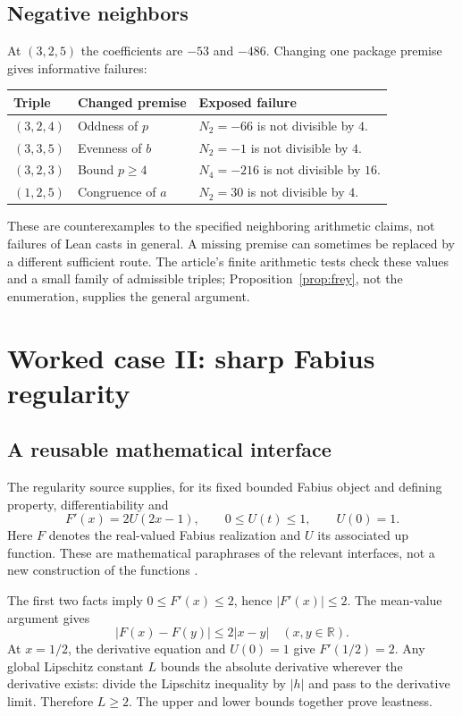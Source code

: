 \documentclass[11pt,a4paper]{article}
\newcommand{\R}{\mathbb R}
\theoremstyle{definition}
\theoremstyle{remark}
\begin{document}
\subsection{Negative neighbors}
At $(3,2,5)$ the coefficients are $-53$ and $-486$. Changing one package premise gives informative failures:
\begin{center}\small
\begin{tabularx}{\textwidth}{@{}l Y Y@{}}
\toprule Triple & Changed premise & Exposed failure\\\midrule
$(3,2,4)$ & Oddness of $p$ & $N_2=-66$ is not divisible by $4$.\\
$(3,3,5)$ & Evenness of $b$ & $N_2=-1$ is not divisible by $4$.\\
$(3,2,3)$ & Bound $p\ge4$ & $N_4=-216$ is not divisible by $16$.\\
$(1,2,5)$ & Congruence of $a$ & $N_2=30$ is not divisible by $4$.\\
\bottomrule
\end{tabularx}
\end{center}
These are counterexamples to the specified neighboring arithmetic claims, not failures of Lean casts in general. A missing premise can sometimes be replaced by a different sufficient route. The article's finite arithmetic tests check these values and a small family of admissible triples; Proposition~\ref{prop:frey}, not the enumeration, supplies the general argument.

\section{Worked case II: sharp Fabius regularity}\label{sec:fabius}
\subsection{A reusable mathematical interface}
The regularity source supplies, for its fixed bounded Fabius object and defining property, differentiability and
\[
 F'(x)=2U(2x-1),\qquad 0\le U(t)\le1,\qquad U(0)=1.
\]
Here $F$ denotes the real-valued Fabius realization and $U$ its associated up function. These are mathematical paraphrases of the relevant interfaces, not a new construction of the functions \cite{regularity}.

The first two facts imply $0\le F'(x)\le2$, hence $|F'(x)|\le2$. The mean-value argument gives
\[
 |F(x)-F(y)|\le2|x-y|\quad(x,y\in\R).
\]
At $x=1/2$, the derivative equation and $U(0)=1$ give $F'(1/2)=2$. Any global Lipschitz constant $L$ bounds the absolute derivative wherever the derivative exists: divide the Lipschitz inequality by $|h|$ and pass to the derivative limit. Therefore $L\ge2$. The upper and lower bounds together prove leastness.
\end{document}
